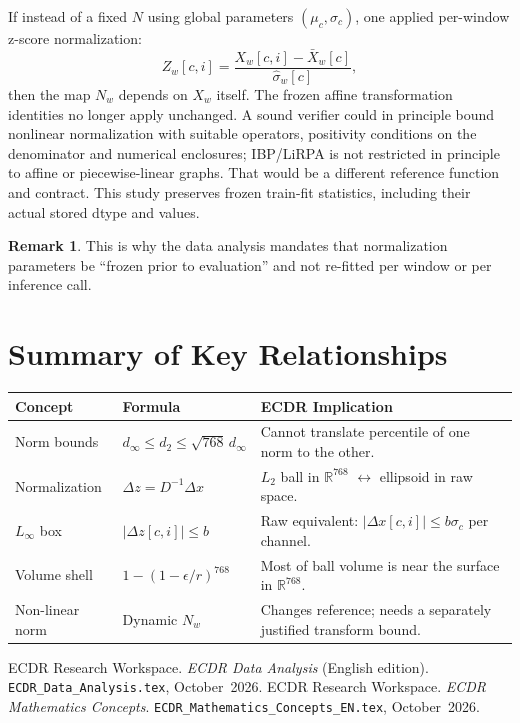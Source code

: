 \documentclass[11pt, a4paper]{article}
\theoremstyle{definition}
\newtheorem{remark}{Remark}[section]
\theoremstyle{plain}
\newcommand{\R}{\mathbb{R}}
\newcommand{\code}[1]{{\small\ttfamily\nolinkurl{#1}}}
\begin{document}
If instead of a fixed $N$ using global parameters $(\mu_c, \sigma_c)$, one applied
per-window z-score normalization:
\[
  Z_w[c, i] = \frac{X_w[c, i] - \bar{X}_w[c]}{\hat{\sigma}_w[c]},
\]
then the map $N_w$ depends on $X_w$ itself. The frozen affine
transformation identities no longer apply unchanged. A sound verifier could
in principle bound nonlinear normalization with suitable operators, positivity
conditions on the denominator and numerical enclosures; IBP/LiRPA is not
restricted in principle to affine or piecewise-linear graphs. That would be a
different reference function and contract. This study preserves frozen
train-fit statistics, including their actual stored dtype and values.

\begin{remark}
  This is why the data analysis mandates that normalization parameters be
  ``frozen prior to evaluation'' and not re-fitted per window or per inference call.
\end{remark}

\section{Summary of Key Relationships}

\begin{center}
\small
\begin{tabularx}{\linewidth}{@{}lYY@{}}
\toprule
Concept & Formula & ECDR Implication \\
\midrule
Norm bounds & $d_\infty \le d_2 \le \sqrt{768}\,d_\infty$ & Cannot translate percentile of one norm to the other. \\
Normalization & $\Delta z = D^{-1} \Delta x$ & $L_2$ ball in $\R^{768}$ $\leftrightarrow$ ellipsoid in raw space. \\
$L_\infty$ box & $|\Delta z[c,i]| \le b$ & Raw equivalent: $|\Delta x[c,i]| \le b \sigma_c$ per channel. \\
Volume shell & $1-(1-\epsilon/r)^{768}$ & Most of ball volume is near the surface in $\R^{768}$. \\
Non-linear norm & Dynamic $N_w$ & Changes reference; needs a separately justified transform bound. \\
\bottomrule
\end{tabularx}
\end{center}

\begin{thebibliography}{9}
  ECDR Research Workspace. \textit{ECDR Data Analysis} (English edition).
  \code{ECDR_Data_Analysis.tex}, October~2026.
  ECDR Research Workspace. \textit{ECDR Mathematics Concepts}.
  \code{ECDR_Mathematics_Concepts_EN.tex}, October~2026.
\end{thebibliography}
\end{document}
